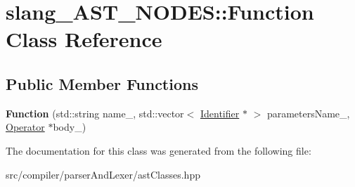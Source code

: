 \hypertarget{classslang__AST__NODES_1_1Function}{}\section{slang\+\_\+\+A\+S\+T\+\_\+\+N\+O\+D\+ES\+:\+:Function Class Reference}
\label{classslang__AST__NODES_1_1Function}
\subsection*{Public Member Functions}
\begin{DoxyCompactItemize}
\item 
{\bfseries Function} (std\+::string name\+\_\+, std\+::vector$<$ \hyperlink{classslang__AST__NODES_1_1Identifier}{Identifier} $\ast$ $>$ parameters\+Name\+\_\+, \hyperlink{classslang__AST__NODES_1_1Operator}{Operator} $\ast$body\+\_\+)\hypertarget{classslang__AST__NODES_1_1Function_a1b5f28e8b549cc3604104b37aac028b5}{}\label{classslang__AST__NODES_1_1Function_a1b5f28e8b549cc3604104b37aac028b5}

\end{DoxyCompactItemize}


The documentation for this class was generated from the following file\+:\begin{DoxyCompactItemize}
\item 
src/compiler/parser\+And\+Lexer/ast\+Classes.\+hpp\end{DoxyCompactItemize}

